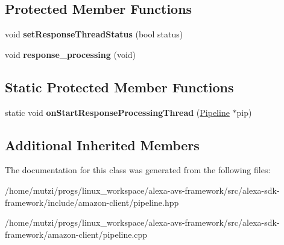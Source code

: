 \subsection*{Protected Member Functions}
\begin{DoxyCompactItemize}
\item 
\mbox{\label{classAVS_1_1Pipeline_a0901d890964c801f21c46a51c518386e}} 
void {\bfseries set\+Response\+Thread\+Status} (bool status)
\item 
\mbox{\label{classAVS_1_1Pipeline_a31e2b7d6bc35189339589041c9b10b63}} 
void {\bfseries response\+\_\+processing} (void)
\end{DoxyCompactItemize}
\subsection*{Static Protected Member Functions}
\begin{DoxyCompactItemize}
\item 
\mbox{\label{classAVS_1_1Pipeline_a03d0305b0d103bfde0c46f89110b054f}} 
static void {\bfseries on\+Start\+Response\+Processing\+Thread} (\hyperlink{classAVS_1_1Pipeline}{Pipeline} $\ast$pip)
\end{DoxyCompactItemize}
\subsection*{Additional Inherited Members}


The documentation for this class was generated from the following files\+:\begin{DoxyCompactItemize}
\item 
/home/mutzi/progs/linux\+\_\+workspace/alexa-\/avs-\/framework/src/alexa-\/sdk-\/framework/include/amazon-\/client/pipeline.\+hpp\item 
/home/mutzi/progs/linux\+\_\+workspace/alexa-\/avs-\/framework/src/alexa-\/sdk-\/framework/amazon-\/client/pipeline.\+cpp\end{DoxyCompactItemize}
